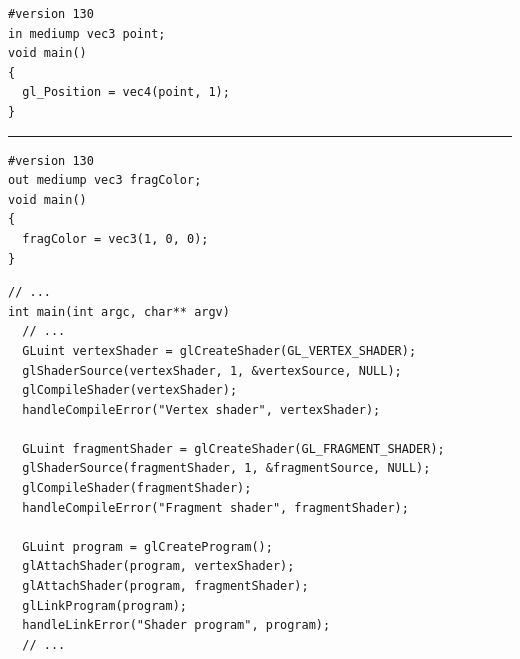 \documentclass[calcdimensions,landscape,letterpaper]{powersem}
\newcommand{\thecurrentheading}{}
\newcommand{\heading}[1]{\renewcommand{\thecurrentheading}{#1}}
\begin{document}
\begin{slide}
    \heading{Minimal Shaders (OpenGL Shader Language (GLSL))}
    \begin{center}
        \begin{minipage}[c]{.5\textwidth}
            \begin{verbatim}
#version 130
in mediump vec3 point;
void main()
{
  gl_Position = vec4(point, 1);
}
            \end{verbatim}
            \vspace{-10pt}
            \rule{4cm}{0.4pt}
            \begin{verbatim}
#version 130
out mediump vec3 fragColor;
void main()
{
  fragColor = vec3(1, 0, 0);
}
            \end{verbatim}
        \end{minipage}
    \end{center}
\end{slide}

\begin{slide}
    \heading{Compile \& Link Shaders}
    \begin{center}
        \begin{minipage}[c]{.95\textwidth}
            \begin{verbatim}
// ...
int main(int argc, char** argv)
  // ...
  GLuint vertexShader = glCreateShader(GL_VERTEX_SHADER);
  glShaderSource(vertexShader, 1, &vertexSource, NULL);
  glCompileShader(vertexShader);
  handleCompileError("Vertex shader", vertexShader);

  GLuint fragmentShader = glCreateShader(GL_FRAGMENT_SHADER);
  glShaderSource(fragmentShader, 1, &fragmentSource, NULL);
  glCompileShader(fragmentShader);
  handleCompileError("Fragment shader", fragmentShader);

  GLuint program = glCreateProgram();
  glAttachShader(program, vertexShader);
  glAttachShader(program, fragmentShader);
  glLinkProgram(program);
  handleLinkError("Shader program", program);
  // ...
            \end{verbatim}
        \end{minipage}
    \end{center}
\end{slide}
\end{document}
